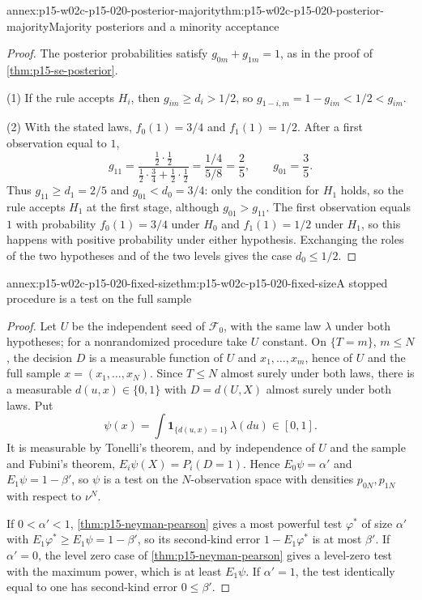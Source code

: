 \begin{annexitem}{annex:p15-w02c-p15-020-posterior-majority}{thm:p15-w02c-p15-020-posterior-majority}{Majority posteriors and a minority acceptance}
\begin{proof}
The posterior probabilities satisfy \(g_{0m}+g_{1m}=1\), as in the proof
of \cref{thm:p15-se-posterior}.

(1) If the rule accepts \(H_i\), then \(g_{im}\geq d_i>1/2\), so
\(g_{1-i,m}=1-g_{im}<1/2<g_{im}\).

(2) With the stated laws, \(f_0(1)=3/4\) and \(f_1(1)=1/2\). After a
first observation equal to \(1\),
\[
 g_{11}=\frac{\tfrac12\cdot\tfrac12}{\tfrac12\cdot\tfrac34+\tfrac12\cdot\tfrac12}
 =\frac{1/4}{5/8}=\frac25,\qquad g_{01}=\frac35 .
\]
Thus \(g_{11}\geq d_1=2/5\) and \(g_{01}<d_0=3/4\): only the condition
for \(H_1\) holds, so the rule accepts \(H_1\) at the first stage,
although \(g_{01}>g_{11}\). The first observation equals \(1\) with
probability \(f_0(1)=3/4\) under \(H_0\) and \(f_1(1)=1/2\) under
\(H_1\), so this happens with positive probability under either
hypothesis. Exchanging the roles of the two hypotheses and of the two
levels gives the case \(d_0\leq1/2\).
\end{proof}
\end{annexitem}

\begin{annexitem}{annex:p15-w02c-p15-020-fixed-size}{thm:p15-w02c-p15-020-fixed-size}{A stopped procedure is a test on the full sample}
\begin{proof}
Let \(U\) be the independent seed of \(\mathcal F_0\), with the same law
\(\lambda\) under both hypotheses; for a nonrandomized procedure take
\(U\) constant. On \(\{T=m\}\), \(m\leq N\), the decision \(D\) is a
measurable function of \(U\) and \(x_1,\ldots,x_m\), hence of \(U\)
and the full sample \(x=(x_1,\ldots,x_N)\). Since \(T\leq N\) almost
surely under both laws, there is a measurable \(d(u,x)\in\{0,1\}\)
with \(D=d(U,X)\) almost surely under both laws. Put
\[
 \psi(x)=\int\mathbf1_{\{d(u,x)=1\}}\,\lambda(du)\in[0,1].
\]
It is measurable by Tonelli's theorem, and by independence of \(U\)
and the sample and Fubini's theorem,
\(E_i\psi(X)=P_i(D=1)\). Hence \(E_0\psi=\alpha'\) and
\(E_1\psi=1-\beta'\), so \(\psi\) is a test on the \(N\)-observation
space with densities \(p_{0N},p_{1N}\) with respect to \(\nu^N\).

If \(0<\alpha'<1\), \cref{thm:p15-neyman-pearson} gives a most
powerful test \(\varphi^*\) of size \(\alpha'\) with
\(E_1\varphi^*\geq E_1\psi=1-\beta'\), so its second-kind error
\(1-E_1\varphi^*\) is at most \(\beta'\). If \(\alpha'=0\), the level
zero case of \cref{thm:p15-neyman-pearson} gives a level-zero test with
the maximum power, which is at least \(E_1\psi\). If \(\alpha'=1\),
the test identically equal to one has second-kind error \(0\leq\beta'\).
\end{proof}
\end{annexitem}

